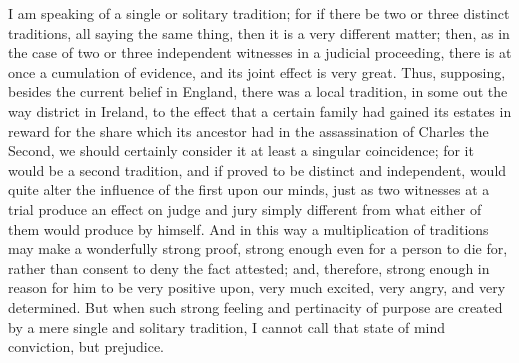 I am speaking of a single or solitary tradition; for
if there be two or three distinct traditions, all saying
the same thing, then it is a very different matter; then,
as in the case of two or three independent witnesses in a
judicial proceeding, there is at once a cumulation of
evidence, and its joint effect is very great. Thus,
supposing, besides the current belief in England, there
was a local tradition, in some out the way district in
Ireland, to the effect that a certain family had gained
its estates in reward for the share which its ancestor
had in the assassination of Charles the Second, we should
certainly consider it at least a singular coincidence;
for it would be a second tradition, and if proved to be
distinct and independent, would quite alter the influence
of the first upon our minds, just as two witnesses at a
trial produce an effect on judge and jury simply
different from what either of them would produce by
himself. And in this way a multiplication of traditions
may make a wonderfully strong proof, strong enough even
for a person to die for, rather than consent to deny the
fact attested; and, therefore, strong enough in reason
for him to be very positive upon, very much excited, very
angry, and very determined. But when such strong feeling
and pertinacity of purpose are created by a mere single
and solitary tradition, I cannot call that state of mind
conviction, but prejudice.

